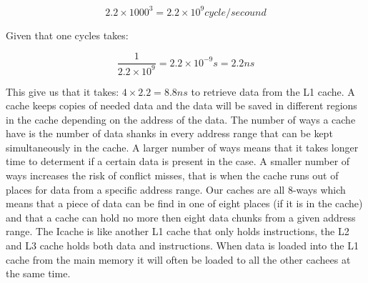 $$ 2.2 \times 1000^3 = 2.2 \times 10^9 cycle / secound$$

Given that one cycles takes:

$$ \frac{1}{2.2 \times 10^9 } = 2.2 \times 10^{-9}s = 2.2ns$$

This give us that it takes: $4 \times 2.2 = 8.8ns$ to retrieve data from the L1 cache. A
cache keeps copies of needed data and the data will be saved in different regions in
the cache depending on the address of the data. The number of ways a cache have
is the number of data shanks in every address range that can be kept simultaneously
in the cache. A larger number of ways means that it takes longer time to determent
if a certain data is present in the case. A smaller number of ways increases the risk
of conflict misses, that is when the cache runs out of places for data from a specific
address range. Our caches are all 8-ways which means that a piece of data can be find
in one of eight places (if it is in the cache) and that a cache can hold no more then
eight data chunks from a given address range. The Icache is like another L1 cache
that only holds instructions, the L2 and L3 cache holds both data and instructions.
When data is loaded into the L1 cache from the main memory it will often be loaded
to all the other cachees at the same time.

